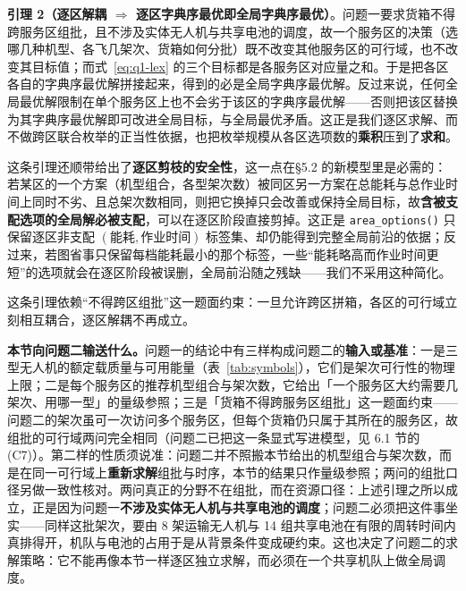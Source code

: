 \textbf{引理 2（逐区解耦 $\Rightarrow$ 逐区字典序最优即全局字典序最优）}。问题一要求货箱不得跨服务区组批，且不涉及实体无人机与共享电池的调度，故一个服务区的决策（选哪几种机型、各飞几架次、货箱如何分批）既不改变其他服务区的可行域，也不改变其目标值；而式~\eqref{eq:q1-lex} 的三个目标都是各服务区对应量之和。于是把各区各自的字典序最优解拼接起来，得到的必是全局字典序最优解。反过来说，任何全局最优解限制在单个服务区上也不会劣于该区的字典序最优解——否则把该区替换为其字典序最优解即可改进全局目标，与全局最优矛盾。这正是我们逐区求解、而不做跨区联合枚举的正当性依据，也把枚举规模从各区选项数的\textbf{乘积}压到了\textbf{求和}。

这条引理还顺带给出了\textbf{逐区剪枝的安全性}，这一点在§5.2 的新模型里是必需的：若某区的一个方案（机型组合，各型架次数）被同区另一方案在总能耗与总作业时间上同时不劣、且总架次数相同，则把它换掉只会改善或保持全局目标，故\textbf{含被支配选项的全局解必被支配}，可以在逐区阶段直接剪掉。这正是 \texttt{area\_options()} 只保留逐区非支配 $(\text{能耗},\text{作业时间})$ 标签集、却仍能得到完整全局前沿的依据；反过来，若图省事只保留每档能耗最小的那个标签，一些“能耗略高而作业时间更短”的选项就会在逐区阶段被误删，全局前沿随之残缺——我们不采用这种简化。

这条引理依赖“不得跨区组批”这一题面约束：一旦允许跨区拼箱，各区的可行域立刻相互耦合，逐区解耦不再成立。

\textbf{本节向问题二输送什么。}问题一的结论中有三样构成问题二的\textbf{输入或基准}：一是三型无人机的额定载质量与可用能量（表~\ref{tab:symbols}），它们是架次可行性的物理上限；二是每个服务区的推荐机型组合与架次数，它给出「一个服务区大约需要几架次、用哪一型」的量级参照；三是「货箱不得跨服务区组批」这一题面约束——问题二的架次虽可一次访问多个服务区，但每个货箱仍只属于其所在的服务区，故组批的可行域两问完全相同（问题二已把这一条显式写进模型，见 6.1 节的 (C7)）。第二样的性质须说准：问题二并不照搬本节给出的机型组合与架次数，而是在同一可行域上\textbf{重新求解}组批与时序，本节的结果只作量级参照；两问的组批口径另做一致性核对。两问真正的分野不在组批，而在资源口径：上述引理之所以成立，正是因为问题一\textbf{不涉及实体无人机与共享电池的调度}；问题二必须把这件事坐实——同样这批架次，要由 8 架运输无人机与 14 组共享电池在有限的周转时间内真排得开，机队与电池的占用于是从背景条件变成硬约束。这也决定了问题二的求解策略：它不能再像本节一样逐区独立求解，而必须在一个共享机队上做全局调度。

